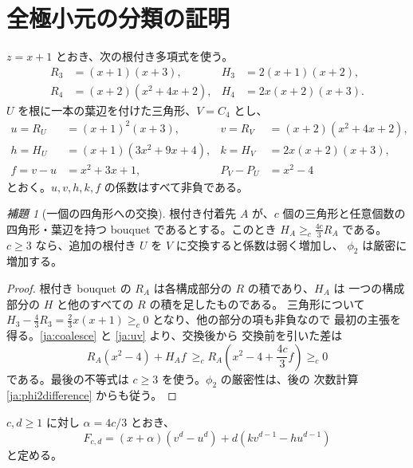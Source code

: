 \documentclass[12pt]{amsart}
\theoremstyle{definition}
\theoremstyle{remark}
\numberwithin{equation}{section}
\newtheorem{jlem}[thm]{補題}
\begin{document}
\section{全極小元の分類の証明}
$z=x+1$ とおき、次の根付き多項式を使う。
\begin{align*}
 R_3&=(x+1)(x+3),&H_3&=2(x+1)(x+2),\\
 R_4&=(x+2)(x^2+4x+2),&H_4&=2x(x+2)(x+3).
\end{align*}
$U$ を根に一本の葉辺を付けた三角形、$V=C_4$ とし、
\begin{align}
 u=R_U&=(x+1)^2(x+3),&v=R_V&=(x+2)(x^2+4x+2),\nonumber\\
 h=H_U&=(x+1)(3x^2+9x+4),&k=H_V&=2x(x+2)(x+3),\label{ja:uv}\\
 f=v-u&=x^2+3x+1,&P_V-P_U&=x^2-4\nonumber
\end{align}
とおく。$u,v,h,k,f$ の係数はすべて非負である。

\begin{jlem}[一個の四角形への交換]\label{ja:exchange}
根付き付着先 $A$ が、$c$ 個の三角形と任意個数の四角形・葉辺を持つ
bouquet であるとする。このとき $H_A\ge_c\frac{4c}{3}R_A$ である。
$c\ge3$ なら、追加の根付き $U$ を $V$ に交換すると係数は弱く増加し、
$\phi_2$ は厳密に増加する。
\end{jlem}
\begin{proof}
根付き bouquet の $R_A$ は各構成部分の $R$ の積であり、$H_A$ は
一つの構成部分の $H$ と他のすべての $R$ の積を足したものである。
三角形について
$H_3-\frac43R_3=\frac23x(x+1)\ge_c0$ となり、他の部分の項も非負なので
最初の主張を得る。\eqref{ja:coalesce} と \eqref{ja:uv} より、交換後から
交換前を引いた差は
\[
 R_A(x^2-4)+H_Af
 \ \ge_c R_A\left(x^2-4+\frac{4c}{3}f\right)\ge_c0
\]
である。最後の不等式は $c\ge3$ を使う。$\phi_2$ の厳密性は、後の
次数計算 \eqref{ja:phi2difference} からも従う。
\end{proof}

$c,d\ge1$ に対し $\alpha=4c/3$ とおき、
\begin{equation}\label{ja:Fcd}
 F_{c,d}=(x+\alpha)(v^d-u^d)
                +d(kv^{d-1}-hu^{d-1})
\end{equation}
と定める。
\end{document}
